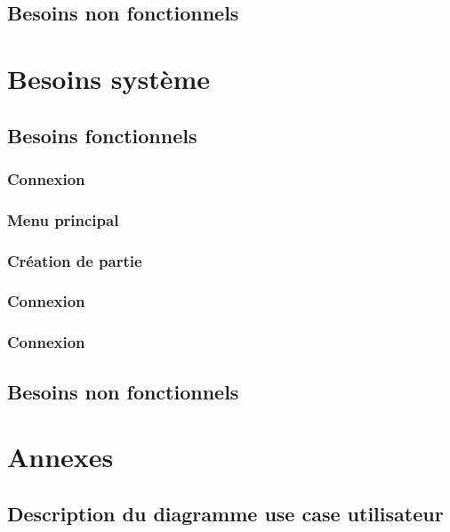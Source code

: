 \documentclass[utf8]{article}
\begin{document}
\subsection{Besoins non fonctionnels}

\section{Besoins système}
\subsection{Besoins fonctionnels}
\subsubsection{Connexion}
\subsubsection{Menu principal}
\subsubsection{Création de partie}
\subsubsection{Connexion}
\subsubsection{Connexion}
\subsection{Besoins non fonctionnels}

\newpage
\section{Annexes}
\subsection{ Description du diagramme use case utilisateur}
\end{document}
